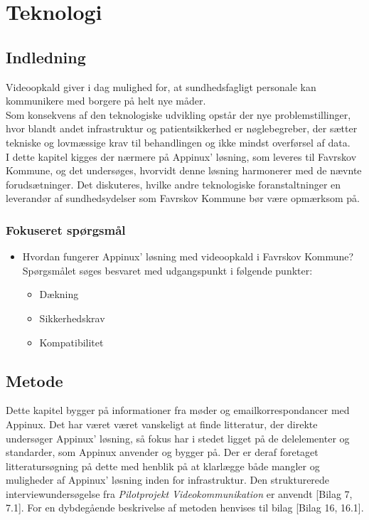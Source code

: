 \chapter{Teknologi}
\label{chap:teknologiafsnit}
\section{Indledning}

Videoopkald giver i dag mulighed for, at sundhedsfagligt personale kan kommunikere med borgere på helt nye måder.
\\
Som konsekvens af den teknologiske udvikling opstår der nye problemstillinger, hvor blandt andet infrastruktur og patientsikkerhed er nøglebegreber, der sætter tekniske og lovmæssige krav til behandlingen og ikke mindst overførsel af data.
\\
I dette kapitel kigges der nærmere på Appinux' løsning, som leveres til Favrskov Kommune, og det undersøges, hvorvidt denne løsning harmonerer med de nævnte forudsætninger. Det diskuteres, hvilke andre teknologiske foranstaltninger en leverandør af sundhedsydelser som Favrskov Kommune bør være opmærksom på.

\subsection{Fokuseret spørgsmål}
\begin{itemize}
	\item Hvordan fungerer Appinux' løsning med videoopkald i Favrskov Kommune? \\Spørgsmålet søges besvaret med udgangspunkt i følgende punkter:
	\begin{itemize}
	\item Dækning
	\item Sikkerhedskrav 
	\item Kompatibilitet 
\end{itemize}
\end{itemize}


\section{Metode}
Dette kapitel bygger på informationer fra møder og emailkorrespondancer med Appinux. Det har været været vanskeligt at finde litteratur, der direkte undersøger Appinux' løsning, så fokus har i stedet ligget på de delelementer og standarder, som Appinux anvender og bygger på. Der er deraf foretaget litteratursøgning på dette med henblik på at klarlægge både mangler og muligheder af Appinux' løsning inden for infrastruktur. Den strukturerede interviewundersøgelse fra \textit{Pilotprojekt Videokommunikation} er anvendt [Bilag 7, 7.1]. For en dybdegående beskrivelse af metoden henvises til bilag [Bilag 16, 16.1].

